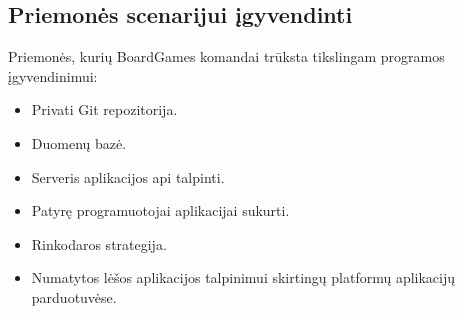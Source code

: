\documentclass{VUMIFPSkursinis}
\begin{document}
	\subsection {Priemonės scenarijui įgyvendinti}
	Priemonės, kurių BoardGames komandai trūksta tikslingam programos įgyvendinimui:
	\renewcommand{\labelitemi}{$\bullet$}
		\begin{itemize}
			\item Privati Git repozitorija.
			\item Duomenų bazė.
			\item Serveris aplikacijos api talpinti.
			\item Patyrę programuotojai aplikacijai sukurti.
			\item Rinkodaros strategija.
			\item Numatytos lėšos aplikacijos talpinimui skirtingų platformų aplikacijų parduotuvėse.
		\end{itemize}		
\end{document}
